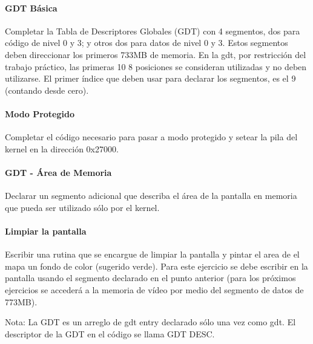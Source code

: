 \paragraph{GDT Básica}\label{subsubsec:ej1-a}
Completar la Tabla de Descriptores Globales (GDT) con 4 segmentos, dos para
código de nivel 0 y 3; y otros dos para datos de nivel 0 y 3. Estos segmentos
deben direccionar los primeros 733MB de memoria. En la gdt, por restricción del
trabajo práctico, las primeras 10 8 posiciones se consideran utilizadas y no
deben utilizarse. El primer índice que deben usar para declarar los segmentos,
es el 9 (contando desde cero).
\hruler
{}

\paragraph{Modo Protegido}\label{subsubsec:ej1-b}
Completar el código necesario para pasar a modo protegido y setear la pila del
kernel en la dirección 0x27000.
\hruler
{}

\paragraph{GDT - Área de Memoria}\label{subsubsec:ej1-c}
Declarar un segmento adicional que describa el área de la pantalla en memoria
que pueda ser utilizado sólo por el kernel.
\hruler
{}

\paragraph{Limpiar la pantalla}\label{subsubsec:ej1-d}
Escribir una rutina que se encargue de limpiar la pantalla y pintar el area de
el mapa un fondo de color (sugerido verde). Para este ejercicio se debe escribir
en la pantalla usando el segmento declarado en el punto anterior (para los
próximos ejercicios se accederá a la memoria de vídeo por medio del segmento de
datos de 773MB).

Nota: La GDT es un arreglo de gdt entry declarado sólo una vez como gdt. El
descriptor de la GDT en el código se llama GDT DESC.
\hruler
{}